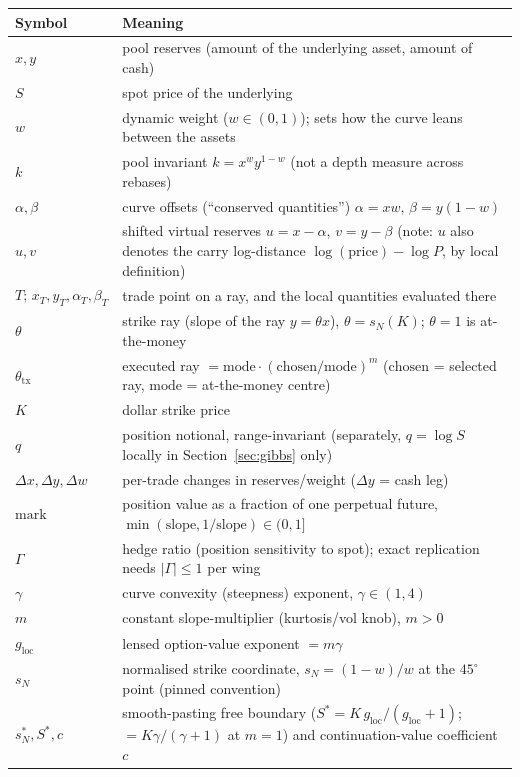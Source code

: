 \documentclass[11pt]{article}
\begin{document}
\begin{center}
\begin{tabular}{ll}
\toprule
Symbol & Meaning \\
\midrule
$x,y$ & pool reserves (amount of the underlying asset, amount of cash) \\
$S$ & spot price of the underlying \\
$w$ & dynamic weight ($w\in(0,1)$); sets how the curve leans between the assets \\
$k$ & pool invariant $k=x^{w}y^{1-w}$ (not a depth measure across rebases) \\
$\alpha,\beta$ & curve offsets (``conserved quantities'') $\alpha=xw$, $\beta=y(1-w)$ \\
$u,v$ & shifted virtual reserves $u=x-\alpha$, $v=y-\beta$ (note: $u$ also denotes the carry log-distance $\log(\text{price})-\log P$, by local definition) \\
$T;\,x_T,y_T,\alpha_T,\beta_T$ & trade point on a ray, and the local quantities evaluated there \\
$\theta$ & strike ray (slope of the ray $y=\theta x$), $\theta=s_{N}(K)$; $\theta=1$ is at-the-money \\
$\theta_{\mathrm{tx}}$ & executed ray $=\mathrm{mode}\cdot(\mathrm{chosen}/\mathrm{mode})^{m}$ ($\mathrm{chosen}$ = selected ray, $\mathrm{mode}$ = at-the-money centre) \\
$K$ & dollar strike price \\
$q$ & position notional, range-invariant (separately, $q=\log S$ locally in Section~\ref{sec:gibbs} only) \\
$\Delta x,\Delta y,\Delta w$ & per-trade changes in reserves/weight ($\Delta y$ = cash leg) \\
$\mathrm{mark}$ & position value as a fraction of one perpetual future, $\min(\mathrm{slope},1/\mathrm{slope})\in(0,1]$ \\
$\Gamma$ & hedge ratio (position sensitivity to spot); exact replication needs $|\Gamma|\le1$ per wing \\
$\gamma$ & curve convexity (steepness) exponent, $\gamma\in(1,4)$ \\
$m$ & constant slope-multiplier (kurtosis/vol knob), $m>0$ \\
$g_{\mathrm{loc}}$ & lensed option-value exponent $=m\gamma$ \\
$s_{N}$ & normalised strike coordinate, $s_{N}=(1-w)/w$ at the $45^{\circ}$ point (pinned convention) \\
$s_{N}^{\ast},S^{\ast},c$ & smooth-pasting free boundary ($S^{\ast}=K\,g_{\mathrm{loc}}/(g_{\mathrm{loc}}+1)$; $=K\gamma/(\gamma+1)$ at $m=1$) and continuation-value coefficient $c$ \\

\end{tabular}
\end{center}
\end{document}

